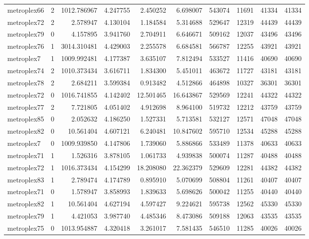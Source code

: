 \begin{longtable}{|l|r|r|r|r|r|r|r|r|r|}
metroplex66 & 2 & 1012.786967 & 4.247755 & 2.450252 & 6.698007 & 543074 & 11691 & 41334 & 41334 \\
metroplex72 & 2 & 2.578947 & 4.130104 & 1.184584 & 5.314688 & 529647 & 12319 & 44439 & 44439 \\
metroplex79 & 0 & 4.157895 & 3.941760 & 2.704911 & 6.646671 & 509162 & 12037 & 43496 & 43496 \\
metroplex76 & 1 & 3014.310481 & 4.429003 & 2.255578 & 6.684581 & 566787 & 12255 & 43921 & 43921 \\
metroplex7 & 1 & 1009.992481 & 4.177387 & 3.635107 & 7.812494 & 533527 & 11416 & 40690 & 40690 \\
metroplex74 & 2 & 1010.373434 & 3.616711 & 1.834300 & 5.451011 & 463672 & 11727 & 43181 & 43181 \\
metroplex78 & 2 & 2.684211 & 3.599384 & 0.913482 & 4.512866 & 464898 & 10327 & 36301 & 36301 \\
metroplex72 & 0 & 1016.741855 & 4.142402 & 12.501465 & 16.643867 & 529569 & 12241 & 44322 & 44322 \\
metroplex77 & 2 & 7.721805 & 4.051402 & 4.912698 & 8.964100 & 519732 & 12212 & 43759 & 43759 \\
metroplex85 & 0 & 2.052632 & 4.186250 & 1.527331 & 5.713581 & 532127 & 12571 & 47048 & 47048 \\
metroplex82 & 0 & 10.561404 & 4.607121 & 6.240481 & 10.847602 & 595710 & 12534 & 45288 & 45288 \\
metroplex7 & 0 & 1009.939850 & 4.147806 & 1.739060 & 5.886866 & 533489 & 11378 & 40633 & 40633 \\
metroplex71 & 1 & 1.526316 & 3.878105 & 1.061733 & 4.939838 & 500074 & 11287 & 40488 & 40488 \\
metroplex72 & 1 & 1016.373434 & 4.154299 & 18.208080 & 22.362379 & 529609 & 12281 & 44382 & 44382 \\
metroplex83 & 1 & 2.789474 & 4.174789 & 0.895910 & 5.070699 & 508804 & 11261 & 40407 & 40407 \\
metroplex71 & 0 & 1.578947 & 3.858993 & 1.839633 & 5.698626 & 500042 & 11255 & 40440 & 40440 \\
metroplex82 & 1 & 10.561404 & 4.627194 & 4.597427 & 9.224621 & 595738 & 12562 & 45330 & 45330 \\
metroplex79 & 1 & 4.421053 & 3.987740 & 4.485346 & 8.473086 & 509188 & 12063 & 43535 & 43535 \\
metroplex75 & 0 & 1013.954887 & 4.320418 & 3.261017 & 7.581435 & 546510 & 11285 & 40026 & 40026 \\

\end{longtable}
